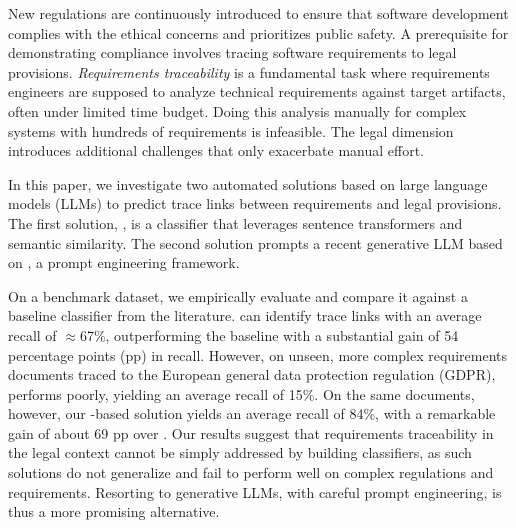 
New regulations are continuously introduced to ensure that software development complies with the ethical concerns and prioritizes public safety. %
A prerequisite for demonstrating compliance involves tracing software requirements to legal provisions. \textit{Requirements traceability} is a fundamental task where requirements engineers are supposed to analyze technical requirements against target artifacts,  %
often under  %
limited time budget. Doing this analysis manually for complex systems with hundreds of requirements is infeasible. The legal dimension introduces additional challenges that only exacerbate manual effort. 

In this paper, we investigate two automated solutions based on large language models (LLMs) to predict trace links between requirements and legal provisions. 
The first solution, \kashif, is a classifier that leverages sentence transformers and semantic similarity. The second solution prompts a recent generative LLM based on \RICE, a prompt engineering framework.

On a benchmark dataset, we empirically evaluate \kashif and compare it against a baseline classifier from the literature.
\kashif can identify trace links with an average recall of $\approx$67\%, %
outperforming the baseline with a substantial gain of 54 percentage points (pp) in recall. %
However, on unseen, more complex requirements documents traced to the European general data protection regulation (GDPR), \kashif performs poorly, yielding an average recall of 15\%. %
On the same documents, however, our \RICE-based solution yields an average recall of 84\%, %
with a remarkable gain of about 69 pp over \kashif. 
Our results suggest that requirements traceability in the legal context cannot be simply addressed by building classifiers, as such solutions do not generalize and fail to perform well on complex regulations and requirements. 
Resorting to generative LLMs, with careful prompt engineering, is thus a more promising alternative. %

